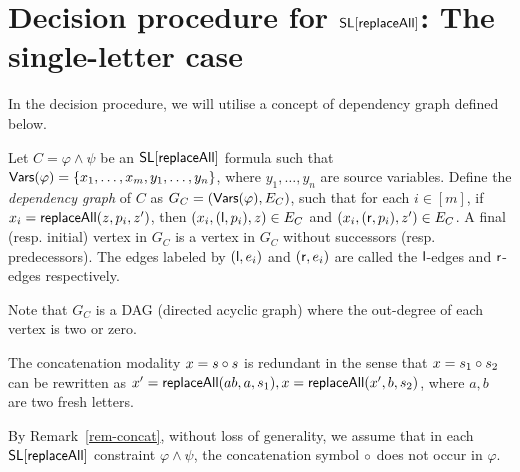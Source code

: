 

\section{Decision procedure for $\mathsf{SL}[\mathsf{replaceAll}]$: The single-letter case} \label{sec:replaceallsl}


In the decision procedure, we will utilise a concept of dependency graph defined below.

\begin{definition}
	Let $C= \varphi \wedge \psi$ be an $\mathsf{SL}[\mathsf{replaceAll}]$ formula such that $\mathsf{Vars}(\varphi) = \{x_1,\dots, x_m, y_1, \dots, y_n\}$, where $y_1,\dots, y_n$ are  source variables. Define the \emph{dependency graph} of $C$ as $G_C= (\mathsf{Vars}(\varphi), E_C)$, such that for each $i \in [m]$, if $x_i = \mathsf{replaceAll}(z, p_i, z')$, then $(x_i, (\mathsf{l}, p_i), z) \in E_C$ and $(x_i, (\mathsf{r}, p_i), z') \in E_C$. A final (resp. initial) vertex in $G_C$ is a vertex in $G_C$ without successors (resp. predecessors). The edges labeled by $(\mathsf{l}, e_i)$ and $(\mathsf{r}, e_i)$ are called the $\mathsf{l}$-edges and $\mathsf{r}$-edges respectively. 
\end{definition}
Note that $G_C$ is a DAG (directed acyclic graph) where the out-degree of each vertex is two or zero. 


\begin{remark}\label{rem-concat}
The concatenation modality $x = s \circ s$ is redundant in the sense that $x = s_1 \circ s_2$ can be rewritten as $x' = \mathsf{replaceAll}(ab, a, s_1), x = \mathsf{replaceAll}(x', b, s_2)$, where $a,b$ are two fresh letters.
\end{remark}

By Remark~\ref{rem-concat}, without loss of generality, we assume that 
in each $\mathsf{SL}[\mathsf{replaceAll}]$ constraint $\varphi \wedge \psi$, the concatenation symbol $\circ$ does not occur in $\varphi$. 



